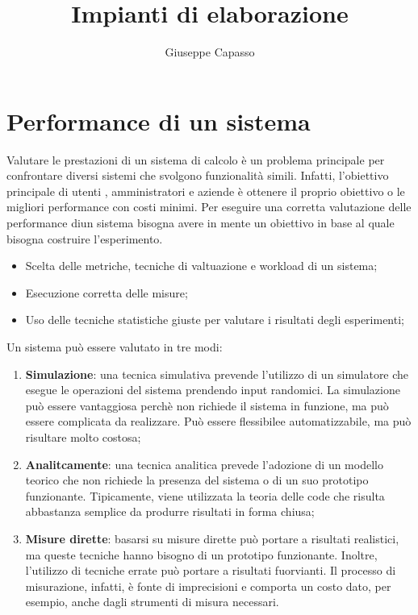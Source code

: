 \documentclass{article}
\title{Impianti di elaborazione}
\author{Giuseppe Capasso}
\begin{document}
\maketitle

\tableofcontents
\newpage

\section{Performance di un sistema}
Valutare le prestazioni di un sistema di calcolo è un problema principale per confrontare
diversi sistemi che svolgono funzionalità simili. Infatti, l'obiettivo principale di utenti
, amministratori e aziende è ottenere il proprio obiettivo o le migliori performance con
costi minimi. Per eseguire una corretta valutazione delle performance diun sistema bisogna
avere in mente un obiettivo in base al quale bisogna costruire l'esperimento. 
\begin{itemize}
  \item Scelta delle metriche, tecniche di valtuazione e workload di un sistema;
  \item Esecuzione corretta delle misure;
  \item Uso delle tecniche statistiche giuste per valutare i risultati degli esperimenti;
\end{itemize}

Un sistema può essere valutato in tre modi:
\begin{enumerate}
  \item \textbf{Simulazione}: una tecnica simulativa prevende l'utilizzo di un simulatore
    che esegue le operazioni del sistema prendendo input randomici. La simulazione può 
    essere vantaggiosa perchè non richiede il sistema in funzione, ma può essere complicata 
    da realizzare. Può essere flessibilee automatizzabile, ma può risultare molto costosa;
  \item \textbf{Analitcamente}: una tecnica analitica prevede l'adozione di un modello 
    teorico che non richiede la presenza del sistema o di un suo prototipo funzionante. 
    Tipicamente, viene utilizzata la teoria delle code che risulta abbastanza semplice da 
    produrre risultati in forma chiusa;
  \item \textbf{Misure dirette}: basarsi su misure dirette può portare a risultati 
    realistici, ma queste tecniche hanno bisogno di un prototipo funzionante. Inoltre,
    l'utilizzo di tecniche errate può portare a risultati fuorvianti. Il processo 
    di misurazione, infatti, è fonte di imprecisioni e comporta un costo dato, 
    per esempio, anche dagli strumenti di misura necessari.
\end{enumerate}
\end{document}
